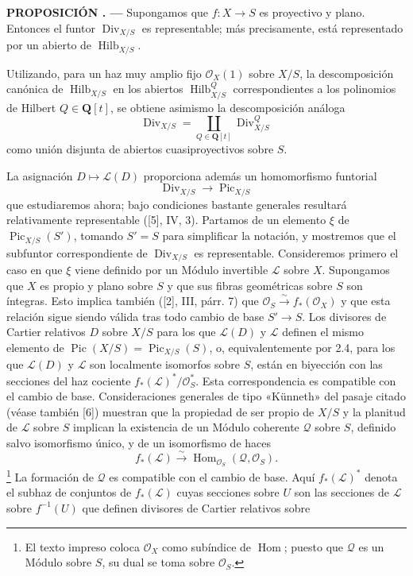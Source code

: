 \documentclass[11pt,twoside,openany]{book}
\numberwithin{equation}{section}
\newcommand{\src}[1]{%
  \phantomsection\hypertarget{src:#1}{}%
  \marginpar{\raggedleft\footnotesize\sffamily #1}%
}
\theoremstyle{plain}
\theoremstyle{definition}
\theoremstyle{remark}
\newcommand{\result}[2]{%
  \par\medskip\noindent\textbf{#1%
  \if\relax\detokenize{#2}\relax\else\space#2\fi. ---}\enspace
}
\newcommand{\FgaUnitKey}{frontmatter}
\renewcommand{\src}[1]{%
  \phantomsection\hypertarget{src:\FgaUnitKey:#1}{}%
  \marginpar{\raggedleft\footnotesize\sffamily #1}%
}
\theoremstyle{plain}
\theoremstyle{definition}
\theoremstyle{remark}
\begin{document}
\src{152}
\result{PROPOSICIÓN}{4.1} Supongamos que $f:X\longrightarrow S$ es proyectivo
y plano. Entonces el funtor $\operatorname{Div}_{X/S}$ es representable; más
precisamente, está representado por un abierto de
$\operatorname{Hilb}_{X/S}$.

Utilizando, para un haz muy amplio fijo $\mathcal O_X(1)$ sobre $X/S$, la
descomposición canónica de $\operatorname{Hilb}_{X/S}$ en los abiertos
$\operatorname{Hilb}^{Q}_{X/S}$ correspondientes a los polinomios de Hilbert
$Q\in\mathbf Q[t]$, se obtiene asimismo la descomposición análoga
\[
\operatorname{Div}_{X/S}=
\coprod_{Q\in\mathbf Q[t]}\operatorname{Div}^{Q}_{X/S}
\]
como unión disjunta de abiertos cuasiproyectivos sobre $S$.

La asignación $D\longmapsto\mathcal L(D)$ proporciona además un homomorfismo
funtorial
\begin{equation}
\operatorname{Div}_{X/S}\longrightarrow\operatorname{Pic}_{X/S}
\tag{+}
\end{equation}
que estudiaremos ahora; bajo condiciones bastante generales resultará
relativamente representable ([5], IV, 3). Partamos de un elemento $\xi$ de
$\operatorname{Pic}_{X/S}(S')$, tomando $S'=S$ para simplificar la notación, y
mostremos que el subfuntor correspondiente de $\operatorname{Div}_{X/S}$ es
representable. Consideremos primero el caso en que $\xi$ viene definido por un
Módulo invertible $\mathcal L$ sobre $X$. Supongamos que $X$ es propio y plano
sobre $S$ y que sus fibras geométricas sobre $S$ son íntegras. Esto implica
también ([2], III, párr. 7) que
$\mathcal O_S\xrightarrow{\sim}f_*(\mathcal O_X)$ y que esta relación sigue
siendo válida tras todo cambio de base $S'\longrightarrow S$. Los divisores de
Cartier relativos $D$ sobre $X/S$ para los que $\mathcal L(D)$ y $\mathcal L$
definen el mismo elemento de
$\operatorname{Pic}(X/S)=\operatorname{Pic}_{X/S}(S)$, o, equivalentemente por
2.4, para los que $\mathcal L(D)$ y $\mathcal L$ son localmente isomorfos sobre
$S$, están en biyección con las secciones del haz cociente
$f_*(\mathcal L)^*/\mathcal O_S^*$. Esta correspondencia es compatible con el
cambio de base. Consideraciones generales de tipo «Künneth» del pasaje citado
(véase también [6]) muestran que la propiedad de ser propio de $X/S$ y la
planitud de $\mathcal L$ sobre $S$ implican la existencia de un Módulo coherente
$\mathcal Q$ sobre $S$, definido salvo isomorfismo único, y de un isomorfismo
de haces
\[
f_*(\mathcal L)\xrightarrow{\sim}
\operatorname{Hom}_{\mathcal O_S}(\mathcal Q,\mathcal O_S).
\]
\footnote{El texto impreso coloca $\mathcal O_X$ como subíndice de
$\operatorname{Hom}$; puesto que $\mathcal Q$ es un Módulo sobre $S$, su dual
se toma sobre $\mathcal O_S$.} La formación de $\mathcal Q$ es compatible con
el cambio de base. Aquí $f_*(\mathcal L)^*$ denota el subhaz de conjuntos de
$f_*(\mathcal L)$ cuyas secciones sobre $U$ son las secciones de $\mathcal L$
sobre $f^{-1}(U)$ que definen divisores de Cartier relativos sobre
\end{document}
